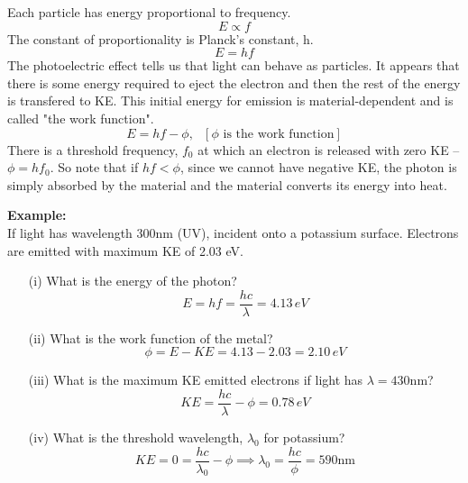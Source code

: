 \documentclass[a4paper, 11pt, normalem]{report}
\begin{document}
Each particle has energy proportional to frequency.
\begin{equation}
    E \propto f
\end{equation}
The constant of proportionality is Planck's constant, h.
\begin{equation}
    E = hf
\end{equation}
The photoelectric effect tells us that light can behave as particles.
It appears that there is some energy required to eject the electron and then the rest of the energy is transfered to KE.
This initial energy for emission is material-dependent and is called "the work function".
\begin{equation}
    E = hf - \phi,~~~[\phi\text{ is the work function}]
\end{equation}
There is a threshold frequency, $f_{0}$ at which an electron is released with zero KE -- $\phi = hf_{0}$.
So note that if $hf < \phi$, since we cannot have negative KE, the photon is simply absorbed by the material and the material converts its energy into heat.

\textbf{Example:}\\
If light has wavelength 300nm (UV), incident onto a potassium surface.
Electrons are emitted with maximum KE of 2.03 eV.
\begin{itemize}
    \item[(i)] What is the energy of the photon?
        \begin{equation}
            E = hf = \frac{hc}{\lambda} = 4.13\,eV
        \end{equation}
    \item[(ii)] What is the work function of the metal?
        \begin{equation}
            \phi = E - KE = 4.13 - 2.03 = 2.10\,eV
        \end{equation}
    \item[(iii)] What is the maximum KE emitted electrons if light has $\lambda = 430$nm?
        \begin{equation}
            KE = \frac{hc}{\lambda} - \phi = 0.78\,eV
        \end{equation}
    \item[(iv)] What is the threshold wavelength, $\lambda_{0}$ for potassium?
        \begin{equation}
            KE = 0 = \frac{hc}{\lambda_{0}} - \phi \implies \lambda_{0} = \frac{hc}{\phi} = 590\text{nm}
        \end{equation}
\end{itemize}
\end{document}
